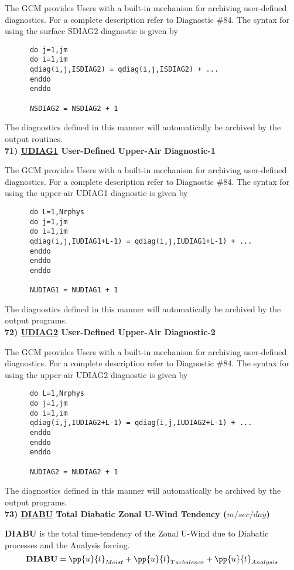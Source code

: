\noindent
The GCM provides Users with a built-in mechanism for archiving user-defined
diagnostics.  For a complete description refer to Diagnostic \#84.
The syntax for using the surface SDIAG2 diagnostic is given by
\begin{verbatim}
      do j=1,jm
      do i=1,im
      qdiag(i,j,ISDIAG2) = qdiag(i,j,ISDIAG2) + ...
      enddo
      enddo

      NSDIAG2 = NSDIAG2 + 1
\end{verbatim}
The diagnostics defined in this manner will automatically be archived by the output routines.
\\

\noindent
{\bf 71)  \underline {UDIAG1} User-Defined Upper-Air Diagnostic-1 }

\noindent
The GCM provides Users with a built-in mechanism for archiving user-defined
diagnostics.  For a complete description refer to Diagnostic \#84.
The syntax for using the upper-air UDIAG1 diagnostic is given by
\begin{verbatim}
      do L=1,Nrphys
      do j=1,jm
      do i=1,im
      qdiag(i,j,IUDIAG1+L-1) = qdiag(i,j,IUDIAG1+L-1) + ...
      enddo
      enddo
      enddo

      NUDIAG1 = NUDIAG1 + 1
\end{verbatim}
The diagnostics defined in this manner will automatically be archived by the 
output programs.
\\

\noindent
{\bf 72)  \underline {UDIAG2} User-Defined Upper-Air Diagnostic-2 }

\noindent
The GCM provides Users with a built-in mechanism for archiving user-defined
diagnostics.  For a complete description refer to Diagnostic \#84.
The syntax for using the upper-air UDIAG2 diagnostic is given by
\begin{verbatim}
      do L=1,Nrphys
      do j=1,jm
      do i=1,im
      qdiag(i,j,IUDIAG2+L-1) = qdiag(i,j,IUDIAG2+L-1) + ...
      enddo
      enddo
      enddo

      NUDIAG2 = NUDIAG2 + 1
\end{verbatim}
The diagnostics defined in this manner will automatically be archived by the 
output programs.
\\


\noindent
{\bf 73)  \underline {DIABU} Total Diabatic Zonal U-Wind Tendency  ($m/sec/day$) }

\noindent
{\bf DIABU} is the total time-tendency of the Zonal U-Wind due to Diabatic processes
and the Analysis forcing.
\[
{\bf DIABU} = \pp{u}{t}_{Moist} + \pp{u}{t}_{Turbulence} + \pp{u}{t}_{Analysis} 
\]
\\

